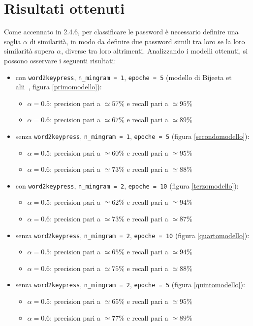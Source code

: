 \section{Risultati ottenuti}
\label{sec:risultati ottenuti}
Come accennato in 2.4.6, per classificare le password è necessario definire una soglia $\alpha$ di similarità, in modo da definire due password simili tra loro se la loro similarità supera $\alpha$, diverse tra loro altrimenti.
Analizzando i modelli ottenuti, si possono osservare i seguenti risultati:
\begin{itemize}
    \item con \texttt{word2keypress}, \texttt{n\_mingram = 1}, \texttt{epoche = 5} (modello di Bijeeta et
    \\alii~\cite{biijeta}, figura \ref{primomodello}):
    \begin{itemize}
        \item $\alpha = 0.5$: precision pari a $\simeq 57\%$ e recall pari a $\simeq 95\%$
        \item $\alpha = 0.6$: precision pari a $\simeq 67\%$ e recall pari a $\simeq 89\%$
    \end{itemize}
    \item senza \texttt{word2keypress}, \texttt{n\_mingram = 1}, \texttt{epoche = 5} (figura \ref{secondomodello}):
    \begin{itemize}
        \item $\alpha = 0.5$: precision pari a $\simeq 60\%$ e recall pari a $\simeq 95\%$
        \item $\alpha = 0.6$: precision pari a $\simeq 73\%$ e recall pari a $\simeq 88\%$
    \end{itemize}
    \item con \texttt{word2keypress}, \texttt{n\_mingram = 2}, \texttt{epoche = 10} (figura \ref{terzomodello}):
    \begin{itemize}
        \item $\alpha = 0.5$: precision pari a $\simeq 62\%$ e recall pari a $\simeq 94\%$
        \item $\alpha = 0.6$: precision pari a $\simeq 73\%$ e recall pari a $\simeq 87\%$
    \end{itemize}
    \item senza \texttt{word2keypress}, \texttt{n\_mingram = 2}, \texttt{epoche = 10} (figura \ref{quartomodello}):
    \begin{itemize}
        \item $\alpha = 0.5$: precision pari a $\simeq 65\%$ e recall pari a $\simeq 94\%$
        \item $\alpha = 0.6$: precision pari a $\simeq 75\%$ e recall pari a $\simeq 88\%$
    \end{itemize}
    \item senza \texttt{word2keypress}, \texttt{n\_mingram = 2}, \texttt{epoche = 5}
    (figura \ref{quintomodello}):
    \begin{itemize}
        \item $\alpha = 0.5$: precision pari a $\simeq 65\%$ e recall pari a $\simeq 95\%$
        \item $\alpha = 0.6$: precision pari a $\simeq 77\%$ e recall pari a $\simeq 89\%$
    \end{itemize}
\end{itemize}
